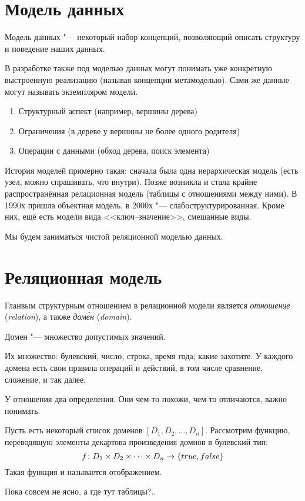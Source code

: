\section{Модель данных}

\begin{Def}
	Модель данных "--- некоторый набор концепций, позволяющий описать структуру и поведение наших данных.
\end{Def}
В разработке также под моделью данных могут понимать уже конкретную выстроенную реализацию (называя концепции метамоделью).
Сами же данные могут называть экземпляром модели.

\begin{enumerate}
	\item Структурный аспект (например, вершины дерева)
	\item Ограничения (в дереве у вершины не более одного родителя)
	\item Операции с данными (обход дерева, поиск элемента)
\end{enumerate}

История моделей примерно такая: сначала была одна иерархическая модель (есть узел, можно спрашивать, что внутри).
Позже возникла и стала крайне распространённая релационная модель (таблицы с отношениями между ними).
В 1990х пришла объектная модель, в 2000х "--- слабоструктурированная.
Кроме них, ещё есть модели вида <<ключ--значение>>, смешанные виды.

Мы будем заниматься чистой реляционной моделью данных.

\section{Реляционная модель}

Гланвым структурным отношением в релационной модели является \textit{отношение} (\textit{relation}),
а также \textit{дом\'ен} (\textit{domain}).

\begin{Def}
	Домен "--- множество допустимых значений.
\end{Def}
Их множество: булевский, число, строка, время года; какие захотите.
У каждого домена есть свои правила операций и действий, в том числе сравнение, сложение, и так далее.

У отношения два определения. Они чем-то похожи, чем-то отличаются, важно понимать.
\begin{Def}
	Пусть есть некоторый список доменов $[D_1, D_2, \dots, D_n]$.
	Рассмотрим функцию, переводящую элементы декартова произведения домнов в булевский тип:
	\[ f\colon D_1 \times D_2 \times \dots \times D_n \rightarrow \{true, false\} \]
	Такая функция и называется отображением.
\end{Def}
Пока совсем не ясно, а где тут таблицы?..

